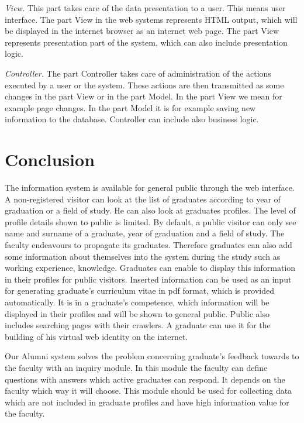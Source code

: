 \documentclass{iitsrc}[2006/14/02]
\begin{document}
{\em View.} This part takes care of the data presentation to a user. This means user interface.  The part View in the web systems represents HTML output, which will be displayed in the internet browser as an internet web page. The part View represents presentation part of the system, which can also include presentation logic.

{\em Controller.} The part Controller takes care of administration of the actions executed by a user or the system. These actions are then transmitted as some changes in the part View or in the part Model. In the part View we mean for example page changes. In the part Model it is for example saving new information to the database. Controller can include also business logic.
      
\section{Conclusion}

The information system is available for general public through the web interface. A non-registered visitor can look at the list of graduates according to year of graduation or a field of study. He can also look at graduates profiles. The level of profile details shown to public is limited. By default, a public visitor can only see name and surname of a graduate, year of graduation and a field of study. The faculty endeavours to propagate its graduates. Therefore graduates can also add some information about themselves into the system during the study such as working experience, knowledge. Graduates can enable to display this information in their profiles for public visitors. Inserted information can be used as an input for generating graduate's curriculum vitae in pdf format, which is provided automatically. It is in a graduate's competence, which information will be displayed in their profiles and will be shown to general public. Public also includes searching pages with their crawlers. A graduate can use it for the building of his virtual web identity on the internet. 

Our Alumni system solves the problem concerning graduate's feedback towards to the faculty with an inquiry module. In this module the faculty can define questions with answers which active graduates can respond. It depends on the faculty which way it will choose. This module should be used for collecting data which are not included in graduate profiles and have high information value for the faculty.

  

\nocite{team14}
\nocite{team15}
\nocite{cakephp}



\end{document}
